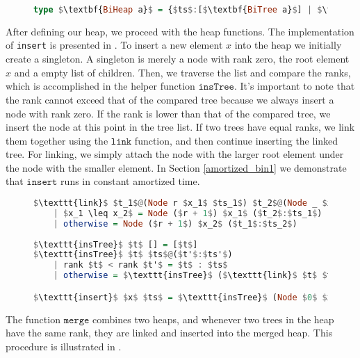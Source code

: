 \documentclass{clmthesis}
\begin{document}
\begin{figure}[h]
\begin{lstlisting}[mathescape=true, language=haskell, caption={Refinement of the data structure \textbf{BiHeap a}.},captionpos=b, label=fig:Biheap]
	  type $\textbf{BiHeap a}$ = {$ts$:[$\textbf{BiTree a}$] | $\texttt{ordRankH}$ $ts$}
\end{lstlisting}
\end{figure}

After defining our heap, we proceed with the heap functions. The implementation of \texttt{insert} is presented in . 
To insert a new element $x$ into the heap we initially create a singleton. A singleton is merely a node with rank zero, the root element $x$ and a empty list of children. Then, we traverse the list and compare the ranks, which is accomplished in the helper function $\texttt{insTree}$. It's important to note that the rank cannot exceed that of the compared tree because we always insert a node with rank zero. If the rank is lower than that of the compared tree, we insert the node at this point in the tree list. If two trees have equal ranks, we link them together using the $\texttt{link}$ function, and then continue inserting the linked tree. For linking, we simply attach the node with the larger root element under the node with the smaller element.
In Section \ref{amortized_bin1} we demonstrate that $\texttt{insert}$ runs in constant amortized time.

\begin{figure}[h]
\begin{lstlisting}[mathescape=true, language=haskell,caption={Insert function.},captionpos=b, label=fig:Binsert]
$\texttt{link}$ $t_1$@(Node r $x_1$ $ts_1$) $t_2$@(Node _ $x_2$ $ts_2$) =
	| $x_1 \leq x_2$ = Node ($r + 1$) $x_1$ ($t_2$:$ts_1$)
	| otherwise = Node ($r + 1$) $x_2$ ($t_1$:$ts_2$)
	
$\texttt{insTree}$ $t$ [] = [$t$]
$\texttt{insTree}$ $t$ $ts$@($t'$:$ts'$) 
	| rank $t$ < rank $t'$ = $t$ : $ts$
	| otherwise = $\texttt{insTree}$ ($\texttt{link}$ $t$ $t'$) $ts'$

$\texttt{insert}$ $x$ $ts$ = $\texttt{insTree}$ (Node $0$ $x$ []) $ts$
\end{lstlisting}
\end{figure}

The function $\texttt{merge}$ combines two heaps, and whenever two trees in the heap have the same rank, they are linked and inserted into the merged heap. This procedure is illustrated in .
\end{document}
